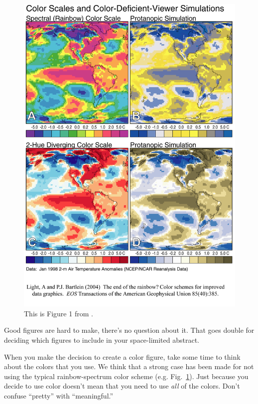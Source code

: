 \documentclass[twoside]{article}
\begin{document}
\begin{figure}
\centering
\includegraphics[width=\columnwidth]{lb_fig1.png}
\caption[Color Scales and Color-Deficient-Viewer Simulations]{
    \label{color_scales}
    This is Figure 1 from \citet{2004EOSTr..85..385L}.  
    }
\end{figure}

Good figures are hard to make, there's no question about it.  That
goes double for deciding which figures to include in your 
space-limited abstract.

When you make the decision to create a color figure, take some time
to think about the colors that you use.  We think that a 
strong case has been made \citep{2004EOSTr..85..385L,borland2007rainbow} for not using the
typical rainbow-spectrum color scheme (e.g. Fig.~\ref{color_scales}).
Just because you decide to use color doesn't mean that you need to
use \emph{all} of the colors.  Don't confuse ``pretty'' with
``meaningful.''
\end{document}
